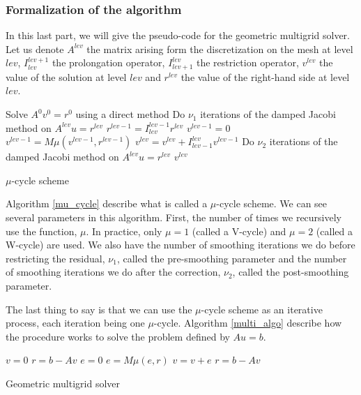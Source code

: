 \subsubsection{Formalization of the algorithm}

In this last part, we will give the pseudo-code for the geometric multigrid solver. Let us denote $A^{lev}$ the matrix arising form the discretization on the mesh at level $lev$, $I_{lev}^{lev+1}$ the prolongation operator, $I_{lev+1}^{lev}$ the restriction operator, $v^{lev}$ the value of the solution at level $lev$ and $r^{lev}$ the value of the right-hand side at level $lev$.

\begin{algorithm}
\begin{algorithmic}
	\State Solve $A^0v^0 = r^0$ using a direct method
\Else
	\State Do $\nu_1$ iterations of the damped Jacobi method on $A^{lev}u = r^{lev}$
	\State $r^{lev-1} = I_{lev}^{lev-1}r^{lev}$
	\State $v^{lev-1} = 0$
	\State $v^{lev-1} = M\mu(v^{lev-1},r^{lev-1})$ 
	\State $v^{lev} = v^{lev} + I_{lev-1}^{lev}v^{lev-1}$
	\State Do $\nu_2$ iterations of the damped Jacobi method on $A^{lev}u = r^{lev}$
\EndIf	
\Return $v^{lev}$
\EndFunction
\end{algorithmic}
\caption{$\mu$-cycle scheme}
\label{mu_cycle}
\end{algorithm}


Algorithm \ref{mu_cycle} describe what is called a $\mu$-cycle scheme. We can see several parameters in this algorithm. First, the number of times we recursively use the function, $\mu$. In practice, only $\mu=1$ (called a V-cycle) and $\mu=2$ (called a W-cycle) are used. We also have the number of smoothing iterations we do before restricting the residual, $\nu_1$, called the pre-smoothing parameter and the number of smoothing iterations we do after the correction, $\nu_2$, called the post-smoothing parameter. 

The last thing to say is that we can use the $\mu$-cycle scheme as an iterative process, each iteration being one $\mu$-cycle. Algorithm \ref{multi_algo} describe how the procedure works to solve the problem defined by $Au=b$.

\begin{algorithm}
\begin{algorithmic}
\State $v = 0$
\State $r = b-Av$
\State $e = 0$
\State $e = M\mu(e,r)$
\State $v = v + e$
\State $r = b-Av$
\EndFor
\end{algorithmic}
\caption{Geometric multigrid solver}
\label{multi_algo}
\end{algorithm}

